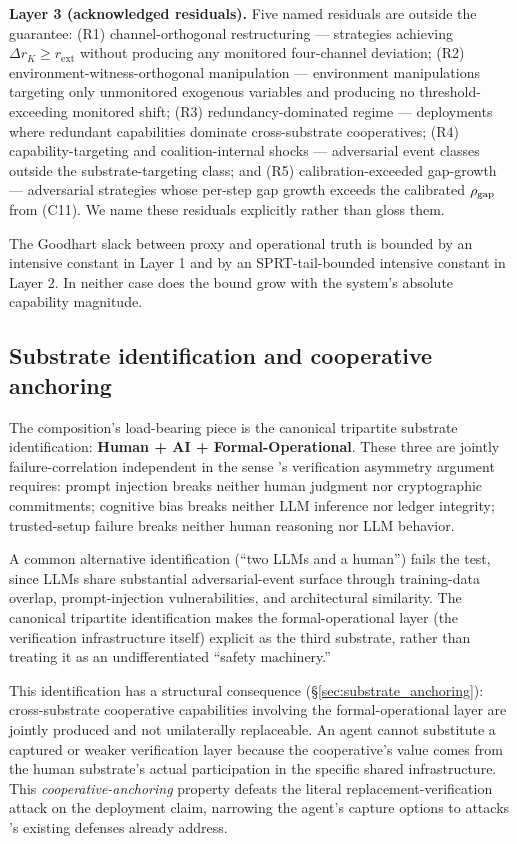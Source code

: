 \textbf{Layer 3 (acknowledged residuals).} Five named residuals are outside the
guarantee: (R1) channel-orthogonal restructuring --- strategies achieving
$\Delta r_K \geq r_{\mathrm{ext}}$ without producing any monitored four-channel
deviation; (R2) environment-witness-orthogonal manipulation --- environment
manipulations targeting only unmonitored exogenous variables and producing no
threshold-exceeding monitored shift; (R3) redundancy-dominated regime ---
deployments where redundant capabilities dominate cross-substrate cooperatives;
(R4) capability-targeting and coalition-internal shocks --- adversarial event
classes outside the substrate-targeting class; and (R5) calibration-exceeded
gap-growth --- adversarial strategies whose per-step gap growth exceeds the
calibrated $\rho_{\mathrm{gap}}$ from (C11).  We name these residuals explicitly rather
than gloss them.

The Goodhart slack between proxy and operational truth is bounded by an
intensive constant in Layer 1 and by an SPRT-tail-bounded intensive constant in
Layer 2. In neither case does the bound grow with the system's absolute
capability magnitude.

\subsection{Substrate identification and cooperative anchoring}
\label{sec:substrate_preview}

The composition's load-bearing piece is the canonical tripartite substrate
identification: \textbf{Human + AI + Formal-Operational}. These three are
jointly failure-correlation independent in the sense
\citep[Exogenous~Verification]{lasser2026exo}'s verification asymmetry argument
requires: prompt injection breaks neither human judgment nor cryptographic
commitments; cognitive bias breaks neither LLM inference nor ledger integrity;
trusted-setup failure breaks neither human reasoning nor LLM behavior.

A common alternative identification (``two LLMs and a human'') fails the test,
since LLMs share substantial adversarial-event surface through training-data
overlap, prompt-injection vulnerabilities, and architectural similarity. The
canonical tripartite identification makes the formal-operational layer (the
verification infrastructure itself) explicit as the third substrate, rather
than treating it as an undifferentiated ``safety machinery.''

This identification has a structural consequence
(\S\ref{sec:substrate_anchoring}): cross-substrate cooperative capabilities
involving the formal-operational layer are jointly produced and not
unilaterally replaceable. An agent cannot substitute a captured or weaker
verification layer because the cooperative's value comes from the human
substrate's actual participation in the specific shared infrastructure. This
\emph{cooperative-anchoring} property defeats the literal
replacement-verification attack on the deployment claim, narrowing the agent's
capture options to attacks \citep[Exogenous~Verification]{lasser2026exo}'s
existing defenses already address.

